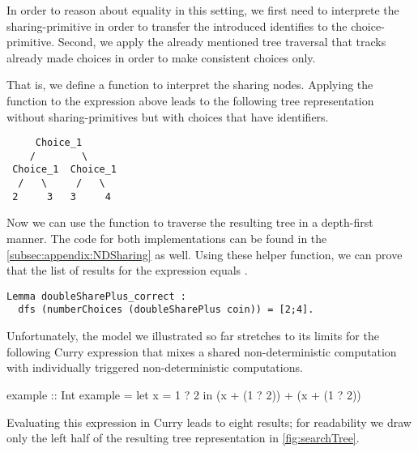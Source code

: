 In order to reason about equality in this setting, we first need to interprete the sharing-primitive in order to transfer the introduced identifies to the choice-primitive.
Second, we apply the already mentioned tree traversal that tracks already made choices in order to make consistent choices only.

That is, we define a function  to interpret the sharing nodes.
Applying the function to the expression above leads to the following tree representation without sharing-primitives but with choices that have identifiers.

\begin{verbatim}
     Choice_1
    /        \
 Choice_1  Choice_1
  /   \     /   \
 2     3   3     4
\end{verbatim}

Now we can use the function  to traverse the resulting tree in a depth-first manner.
The code for both implementations can be found in the \autoref{subsec:appendix:NDSharing} as well.
Using these helper function, we can prove that the list of results for the expression \cinl{doubleSharePlus coin} equals \cinl{[2;4]}.

\begin{verbatim}
Lemma doubleSharePlus_correct :
  dfs (numberChoices (doubleSharePlus coin)) = [2;4].
\end{verbatim}

Unfortunately, the model we illustrated so far stretches to its limits for the following Curry expression that mixes a shared non-deterministic computation with individually triggered non-deterministic computations.

\begin{curry}
example :: Int
example = let x = 1 ? 2 in (x + (1 ? 2)) + (x + (1 ? 2))  
\end{curry}

Evaluating this expression in Curry leads to eight results; for readability we draw only the left half of the resulting tree representation in \autoref{fig:searchTree}.

